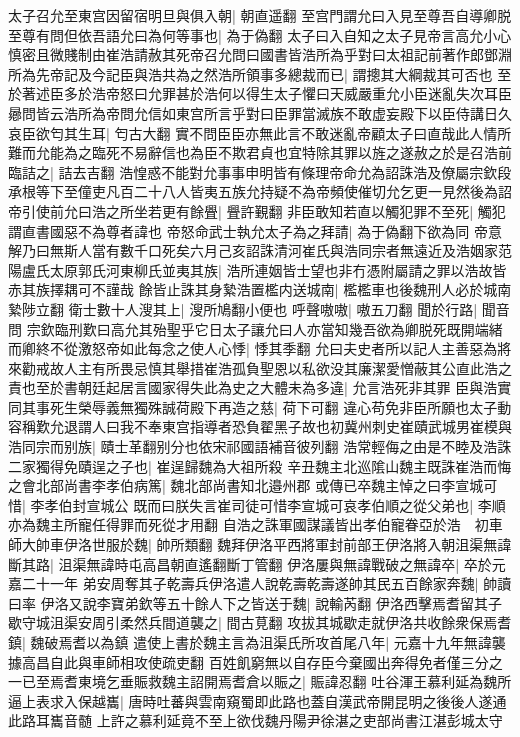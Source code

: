 太子召允至東宫因留宿明旦與俱入朝|{
	朝直遥翻}
至宫門謂允曰入見至尊吾自導卿脱至尊有問但依吾語允曰為何等事也|{
	為于偽翻}
太子曰入自知之太子見帝言高允小心慎密且微賤制由崔浩請赦其死帝召允問曰國書皆浩所為乎對曰太祖記前著作郎鄧淵所為先帝記及今記臣與浩共為之然浩所領事多總裁而已|{
	謂摠其大綱裁其可否也}
至於著述臣多於浩帝怒曰允罪甚於浩何以得生太子懼曰天威嚴重允小臣迷亂失次耳臣曏問皆云浩所為帝問允信如東宫所言乎對曰臣罪當滅族不敢虚妄殿下以臣侍講日久哀臣欲匄其生耳|{
	匄古大翻}
實不問臣臣亦無此言不敢迷亂帝顧太子曰直哉此人情所難而允能為之臨死不易辭信也為臣不欺君貞也宜特除其罪以旌之遂赦之於是召浩前臨詰之|{
	詰去吉翻}
浩惶惑不能對允事事申明皆有條理帝命允為詔誅浩及僚屬宗欽段承根等下至僮吏凡百二十八人皆夷五族允持疑不為帝頻使催切允乞更一見然後為詔帝引使前允曰浩之所坐若更有餘舋|{
	舋許覲翻}
非臣敢知若直以觸犯罪不至死|{
	觸犯謂直書國惡不為尊者諱也}
帝怒命武士執允太子為之拜請|{
	為于偽翻下欲為同}
帝意解乃曰無斯人當有數千口死矣六月己亥詔誅清河崔氏與浩同宗者無遠近及浩姻家范陽盧氏太原郭氏河東柳氏並夷其族|{
	浩所連姻皆士望也非冇憑附屬請之罪以浩故皆赤其族擇耦可不謹哉}
餘皆止誅其身縶浩置檻内送城南|{
	檻檻車也後魏刑人必於城南縶陟立翻}
衛士數十人溲其上|{
	溲所鳩翻小便也}
呼聲嗷嗷|{
	嗷五刀翻}
聞於行路|{
	聞音問}
宗欽臨刑歎曰高允其殆聖乎它日太子讓允曰人亦當知幾吾欲為卿脱死既開端緒而卿終不從激怒帝如此每念之使人心悸|{
	悸其季翻}
允曰夫史者所以記人主善惡為將來勸戒故人主有所畏忌慎其舉措崔浩孤負聖恩以私欲没其廉潔愛憎蔽其公直此浩之責也至於書朝廷起居言國家得失此為史之大體未為多違|{
	允言浩死非其罪}
臣與浩實同其事死生榮辱義無獨殊誠荷殿下再造之慈|{
	荷下可翻}
違心苟免非臣所願也太子動容稱歎允退謂人曰我不奉東宫指導者恐負翟黑子故也初冀州刺史崔賾武城男崔模與浩同宗而别族|{
	賾士革翻别分也依宋祁國語補音彼列翻}
浩常輕侮之由是不睦及浩誅二家獨得免賾逞之子也|{
	崔逞歸魏為大祖所殺}
辛丑魏主北巡隂山魏主既誅崔浩而悔之會北部尚書李孝伯病篤|{
	魏北部尚書知北邉州郡}
或傳已卒魏主悼之曰李宣城可惜|{
	李孝伯封宣城公}
既而曰朕失言崔司徒可惜李宣城可哀孝伯順之從父弟也|{
	李順亦為魏主所寵任得罪而死從才用翻}
自浩之誅軍國謀議皆出孝伯寵眷亞於浩　初車師大帥車伊洛世服於魏|{
	帥所類翻}
魏拜伊洛平西將軍封前部王伊洛將入朝沮渠無諱斷其路|{
	沮渠無諱時屯高昌朝直遙翻斷丁管翻}
伊洛屢與無諱戰破之無諱卒|{
	卒於元嘉二十一年}
弟安周奪其子乾壽兵伊洛遣人說乾壽乾壽遂帥其民五百餘家奔魏|{
	帥讀曰率}
伊洛又說李寶弟欽等五十餘人下之皆送于魏|{
	說輸芮翻}
伊洛西擊焉耆留其子歇守城沮渠安周引柔然兵間道襲之|{
	間古莧翻}
攻拔其城歇走就伊洛共收餘衆保焉耆鎮|{
	魏破焉耆以為鎮}
遣使上書於魏主言為沮渠氏所攻首尾八年|{
	元嘉十九年無諱襲據高昌自此與車師相攻使疏吏翻}
百姓飢窮無以自存臣今棄國出奔得免者僅三分之一已至焉耆東境乞垂賑救魏主詔開焉耆倉以賑之|{
	賑諱忍翻}
吐谷渾王慕利延為魏所逼上表求入保越巂|{
	唐時吐蕃與雲南窺蜀即此路也蓋自漢武帝開昆明之後後人遂通此路耳巂音髄}
上許之慕利延竟不至上欲伐魏丹陽尹徐湛之吏部尚書江湛彭城太守

